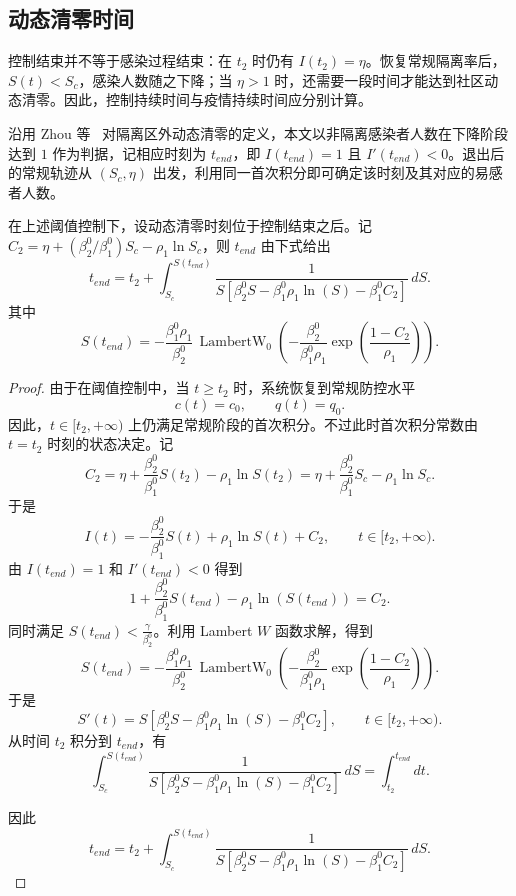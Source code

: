 \documentclass[lang=cn,a4paper,newtx]{elegantpaper}
\numberwithin{equation}{section}
\theoremstyle{plain}
\begin{document}
\subsection{动态清零时间}
控制结束并不等于感染过程结束：在 $t_2$ 时仍有 $I(t_2)=\eta$。恢复常规隔离率后，$S(t)<S_c$，感染人数随之下降；当 $\eta>1$ 时，还需要一段时间才能达到社区动态清零。因此，控制持续时间与疫情持续时间应分别计算。

沿用 Zhou 等~\cite{Zhou2024SPCI} 对隔离区外动态清零的定义，本文以非隔离感染者人数在下降阶段达到 $1$ 作为判据，记相应时刻为 $t_{end}$，即 $I(t_{end})=1$ 且 $I'(t_{end})<0$。退出后的常规轨迹从 $(S_c,\eta)$ 出发，利用同一首次积分即可确定该时刻及其对应的易感者人数。
\begin{theorem}\label{thm:s1:tend}
    在上述阈值控制下，设动态清零时刻位于控制结束之后。记 $C_2=\eta+(\beta_2^0/\beta_1^0)S_c-\rho_1\ln S_c$，则 $t_{end}$ 由下式给出
    \[
    t_{end}=t_2+\int_{S_c}^{S(t_{end})}\frac{1}
    {S\left[\beta_2^0 S-\beta_1^0 \rho_1 \ln(S)-
    \beta_1^0 C_2\right]}\, dS .
    \]
    其中
    \begin{equation}
    S(t_{end})=
    -\frac{\beta_1^0 \rho_1}{\beta_2^0}\,
    \operatorname{LambertW}_0
    \left(
    -\frac{\beta_2^0}{\beta_1^0 \rho_1}
    \exp\left(
    \frac{1-C_2}{\rho_1}
    \right)
    \right).
    \label{eq:s1:Send}
    \end{equation}
\end{theorem}
\begin{proof}
    由于在阈值控制中，当 $t\ge t_2$ 时，系统恢复到常规防控水平
    \[
    c(t)=c_0,\qquad q(t)=q_0.
    \]
    因此，$t\in[t_2,+\infty)$ 上仍满足常规阶段的首次积分。不过此时首次积分常数由
    $t=t_2$ 时刻的状态决定。记
    \[
    C_2=\eta+\frac{\beta_2^0}{\beta_1^0}S(t_2)-\rho_1\ln S(t_2)=\eta+\frac{\beta_2^0}{\beta_1^0}S_c-\rho_1\ln S_c.
    \]
    于是
    \[
    I(t)
    =
    -\frac{\beta_2^0}{\beta_1^0} S(t)
    +
    \rho_1 \ln S(t)
    +
    C_2,
    \qquad
    t \in [t_2,+\infty).
    \]
    由 $I(t_{end})=1$ 和 $I'(t_{end})<0$ 得到
    \[
    1
    +
    \frac{\beta_2^0}{\beta_1^0} S(t_{end})
    -
    \rho_1 \ln(S(t_{end}))
    =
    C_2 .
    \]
    同时满足 $S(t_{end})<\frac{\gamma}{\beta_2^0}$。利用 Lambert $W$ 函数求解，得到
    \[
    S(t_{end})=
    -\frac{\beta_1^0 \rho_1}{\beta_2^0}\,
    \operatorname{LambertW}_0
    \left(
    -\frac{\beta_2^0}{\beta_1^0 \rho_1}
    \exp\left(
    \frac{1-C_2}{\rho_1}
    \right)
    \right).
    \]
    于是
    \[
    S'(t)=S\left[\beta_2^0 S-
    \beta_1^0 \rho_1 \ln(S)
    -\beta_1^0 C_2
    \right],
    \qquad
    t \in [t_2,+\infty).
    \]
    从时间 $t_2$ 积分到 $t_{end}$，有
    \[
    \int_{S_c}^{S(t_{end})}
    \frac{1}
    {
    S\left[
    \beta_2^0 S
    -
    \beta_1^0 \rho_1 \ln(S)
    -
    \beta_1^0 C_2
    \right]
    }
    \, dS
    =
    \int_{t_2}^{t_{end}} dt .
    \]

    因此
    \[
    t_{end}=t_2+\int_{S_c}^{S(t_{end})}\frac{1}
    {S\left[\beta_2^0 S-\beta_1^0 \rho_1 \ln(S)-
    \beta_1^0 C_2\right]}\, dS .
    \]
\end{proof}
\end{document}
